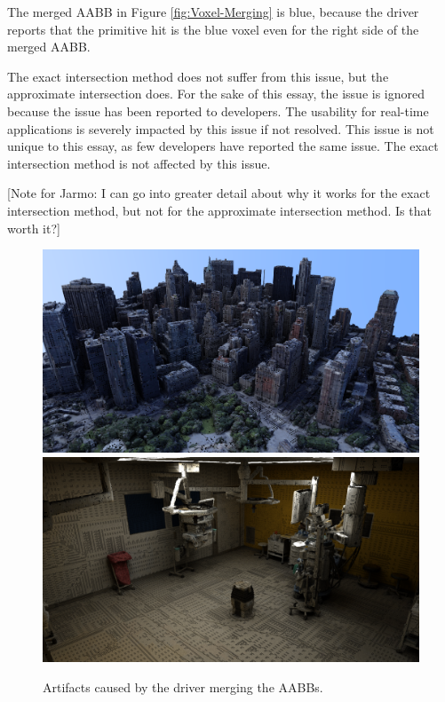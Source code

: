 \documentclass[12pt]{article}
\begin{document}
The merged AABB in Figure \ref{fig:Voxel-Merging} is blue,
because the driver reports that the primitive hit is the blue voxel even for the right side of the merged AABB.

The exact intersection method does not suffer from this issue, but the approximate intersection does.
For the sake of this essay, the issue is ignored because the issue has been reported to developers.
The usability for real-time applications is severely impacted by this issue if not resolved.
This issue is not unique to this essay, as few developers have reported the same issue.
The exact intersection method is not affected by this issue.

    [Note for Jarmo: I can go into greater detail about why it works for the exact intersection method, but not for the approximate intersection method. Is that worth it?]
\parencite{NVIDIA:AABB-Merging}

\begin{figure}[H]
    \begin{center}
        \includegraphics[scale=0.25]{NewYorkCity-Merging}
        \smallbreak
        \includegraphics[scale=0.25]{OperationRoom-Merging}
    \end{center}
    \caption{
        Artifacts caused by the driver merging the AABBs.
    }
    \label{fig:Scenes-Merging}
\end{figure}
\end{document}
